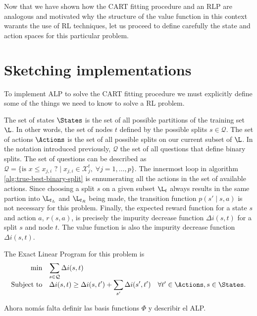 Now that we have shown how the CART fitting procedure and an RLP are analogous
and motivated why the structure of the value function in this context warants
the use of RL techniques, let us proceed to define carefully the state and
action spaces for this particular problem.

\section{Sketching implementations}

To implement ALP to solve the CART fitting procedure we must explicitly define
some of the things we need to know to solve a RL problem.

The set of states $\States$ is the set of all possible partitions of the
training set $\L$. In other words, the set of nodes $t$ defined by the possible
splits $s \in \mathcal{Q}$. The set of actions $\Actions$ is the set of all
possible splits on our current subset of $\L$. In the notation introduced
previously, $\mathcal{Q}$ the set of all questions that define binary splits.
The set of questions can be described as $\mathcal{Q} = \{ \text{is } x \leq
x_{j, i} \text{ ?} \mid x_{j, i} \in \mathcal{X}_{j}^{t}, \; \forall j = 1,
\dots, p \}$.  The innermost loop in algorithm \ref{alg:true-best-binary-split}
is ennumerating all the actions in the set of available actions. Since choosing
a split $s$ on a given subset $\L_t$ always results in the same partion into
$\L_{t_L}$ and $\L_{t_R}$ being made, the transition function $p(s' \mid s, a)$
is not necessary for this problem. Finally, the expected reward function for a
state $s$ and action $a$, $r(s, a)$, is precisely the impurity decrease function
$\Delta i(s, t)$ for a split $s$ and node $t$. The value function is also the
impurity decrease function $\Delta i (s, t)$.

The Exact Linear Program for this problem is
\begin{equation}
\begin{array}{rl@{}ll}
    \displaystyle \min & \displaystyle \sum_{s \in \mathcal{Q}} \Delta i(s, t) \\
    \text{Subject to} & \displaystyle \Delta i(s, t) \geq \Delta i(s, t') + \sum_{s'} \Delta i(s', t') & \quad \forall t' \in \Actions, s \in \States. \\
\end{array}
\end{equation}

Ahora nomás falta definir las basis functions $\Phi$ y describir el ALP.